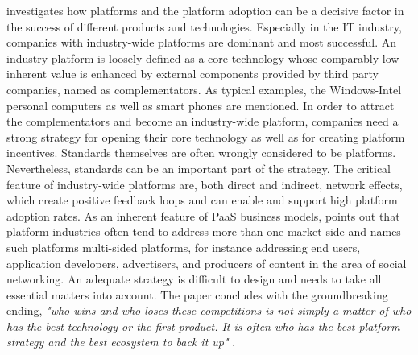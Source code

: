 \citet{Cusumano2010} investigates how platforms and the platform adoption can be a decisive factor in the success of different products and technologies. Especially in the \ac{IT} industry, companies with industry-wide platforms are dominant and most successful. An industry platform is loosely defined as a core technology whose comparably low inherent value is enhanced by external components provided by third party companies, named as complementators. As typical examples, the Windows-Intel personal computers as well as smart phones are mentioned. In order to attract the complementators and become an industry-wide platform, companies need a strong strategy for opening their core technology as well as for creating platform incentives. Standards themselves are often wrongly considered to be platforms. Nevertheless, standards can be an important part of the strategy. The critical feature of industry-wide platforms are, both direct and indirect, network effects, which create positive feedback loops and can enable and support high platform adoption rates. As an inherent feature of \ac{PaaS} business models, \citet{Cusumano2010} points out that platform industries often tend to address more than one market side and names such platforms multi-sided platforms, for instance addressing end users, application developers, advertisers, and producers of content in the area of social networking. An adequate strategy is difficult to design and needs to take all essential matters into account. The paper concludes with the groundbreaking ending, \textit{"who wins and who loses these competitions is not simply a matter of who has the best technology or the first product. It is often who has the best platform strategy and the best ecosystem to back it up"} \citep[p. 34]{Cusumano2010}.

